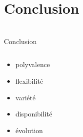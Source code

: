 \section{Conclusion}
\begin{frame}{\bititle\\Conclusion}
\begin{columns}\begin{column}{.5\textwidth}

\begin{itemize}
\item<1-> polyvalence
\item<2-> flexibilité
\item<3-> variété
\item<4-> disponibilité
\item<5-> évolution
\end{itemize}

\end{column}\begin{column}{.5\textwidth}


\end{column}\end{columns}
\end{frame}
